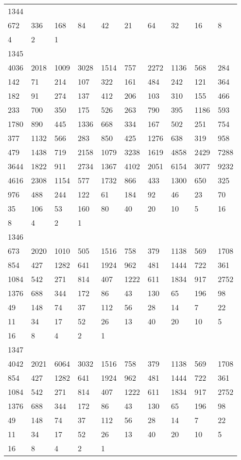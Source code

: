 \begin{longtable}{*{10}{l}}
1344&&&&&&&&&\\
672& 336& 168& 84& 42& 21& 64& 32& 16& 8\\
4& 2& 1& \\

1345&&&&&&&&&\\
4036& 2018& 1009& 3028& 1514& 757& 2272& 1136& 568& 284\\
142& 71& 214& 107& 322& 161& 484& 242& 121& 364\\
182& 91& 274& 137& 412& 206& 103& 310& 155& 466\\
233& 700& 350& 175& 526& 263& 790& 395& 1186& 593\\
1780& 890& 445& 1336& 668& 334& 167& 502& 251& 754\\
377& 1132& 566& 283& 850& 425& 1276& 638& 319& 958\\
479& 1438& 719& 2158& 1079& 3238& 1619& 4858& 2429& 7288\\
3644& 1822& 911& 2734& 1367& 4102& 2051& 6154& 3077& 9232\\
4616& 2308& 1154& 577& 1732& 866& 433& 1300& 650& 325\\
976& 488& 244& 122& 61& 184& 92& 46& 23& 70\\
35& 106& 53& 160& 80& 40& 20& 10& 5& 16\\
8& 4& 2& 1& \\

1346&&&&&&&&&\\
673& 2020& 1010& 505& 1516& 758& 379& 1138& 569& 1708\\
854& 427& 1282& 641& 1924& 962& 481& 1444& 722& 361\\
1084& 542& 271& 814& 407& 1222& 611& 1834& 917& 2752\\
1376& 688& 344& 172& 86& 43& 130& 65& 196& 98\\
49& 148& 74& 37& 112& 56& 28& 14& 7& 22\\
11& 34& 17& 52& 26& 13& 40& 20& 10& 5\\
16& 8& 4& 2& 1& \\

1347&&&&&&&&&\\
4042& 2021& 6064& 3032& 1516& 758& 379& 1138& 569& 1708\\
854& 427& 1282& 641& 1924& 962& 481& 1444& 722& 361\\
1084& 542& 271& 814& 407& 1222& 611& 1834& 917& 2752\\
1376& 688& 344& 172& 86& 43& 130& 65& 196& 98\\
49& 148& 74& 37& 112& 56& 28& 14& 7& 22\\
11& 34& 17& 52& 26& 13& 40& 20& 10& 5\\
16& 8& 4& 2& 1& \\


\end{longtable}

